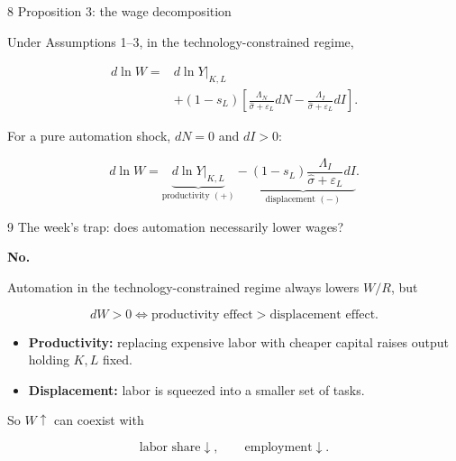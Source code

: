 \documentclass[aspectratio=169,11pt]{beamer}
\begin{document}

\begin{frame}{8 \textperiodcentered{} Proposition 3: the wage decomposition}

  Under Assumptions 1--3, in the technology-constrained regime,

  \[
  \begin{aligned}
  d\ln W
  ={}&
  d\ln Y\big|_{K,L}
  \\
  &+
  (1-s_L)
  \left[
    \frac{\Lambda_N}
    {\widehat\sigma+\varepsilon_L}dN
    -
    \frac{\Lambda_I}
    {\widehat\sigma+\varepsilon_L}dI
  \right].
  \end{aligned}
  \]

  For a pure automation shock, $dN=0$ and $dI>0$:

  \[
    d\ln W
    =
    \underbrace{
      d\ln Y\big|_{K,L}
    }_{\text{productivity }(+)}
    -
    \underbrace{
      (1-s_L)
      \frac{\Lambda_I}
      {\widehat\sigma+\varepsilon_L}dI
    }_{\text{displacement }(-)}.
  \]

\end{frame}


\begin{frame}{9 \textperiodcentered{} The week's trap: does automation necessarily lower wages?}

  \textbf{No.}

  \medskip

  Automation in the technology-constrained regime always lowers
  $W/R$, but

  \[
    \boxed{
    dW>0
    \iff
    \text{productivity effect}
    >
    \text{displacement effect}
    }.
  \]

  \begin{itemize}\small

    \item \textbf{Productivity:}
    replacing expensive labor with cheaper capital raises output
    holding $K,L$ fixed.

    \item \textbf{Displacement:}
    labor is squeezed into a smaller set of tasks.

  \end{itemize}

  \medskip

  So $W\uparrow$ can coexist with

  \[
    \text{labor share}\downarrow,
    \qquad
    \text{employment}\downarrow.
  \]

\end{frame}
\end{document}
